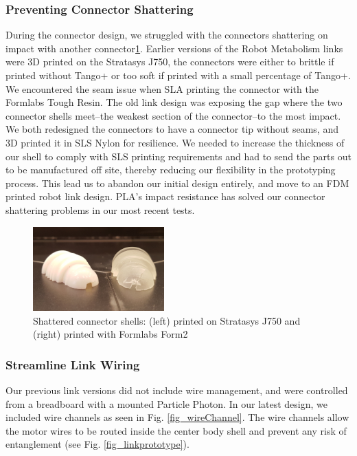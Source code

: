 \documentclass[letterpaper, 10 pt, conference]{ieeeconf}  %
\begin{document}
\subsubsection{Preventing Connector Shattering}
During the connector design, we struggled with the connectors shattering on impact with another connector\ref{shatter}. Earlier versions of the Robot Metabolism links were 3D printed on the Stratasys J750, the connectors were either to brittle if printed without Tango+ or too soft if printed with a small percentage of Tango+. We encountered the seam issue when SLA printing the connector with the Formlabs Tough Resin. The old link design was exposing the gap where the two connector shells meet--the weakest section of the connector--to the most impact. We both redesigned the connectors to have a connector tip without seams, and 3D printed it in SLS Nylon for resilience. We needed to increase the thickness of our shell to comply with SLS printing requirements and had to send the parts out to be manufactured off site, thereby reducing our flexibility in the prototyping process. This lead us to abandon our initial design entirely, and move to an FDM printed robot link design. PLA's impact resistance has solved our connector shattering problems in our most recent tests.

\begin{figure}
\centering
\includegraphics[width=0.45\textwidth]{media/shatter.jpg}
   \caption{\label{shatter}  Shattered connector shells: (left) printed on Stratasys J750 and (right) printed with Formlabs Form2}
\end{figure}

\subsubsection{Streamline Link Wiring} Our previous link versions did not include wire management, and were controlled from a breadboard with a mounted Particle Photon. In our latest design, we included wire channels as seen in Fig. \ref{fig_wireChannel}. The wire channels allow the motor wires to be routed inside the center body shell and prevent any risk of entanglement (see Fig. \ref{fig_linkprototype}).
\end{document}
